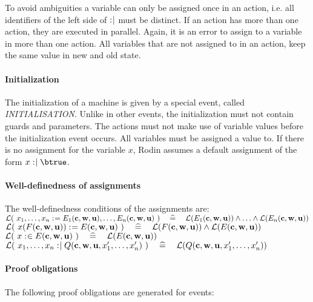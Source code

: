 To avoid ambiguities a variable can only be assigned once in an action, i.e. all identifiers 
  of the left side of $\mathrel{:\mkern1mu\mid}$ must be distinct.
If an action has more than one action, they are executed in parallel. Again, it is an error
  to assign to a variable in more than one action.
All variables that are not assigned to in an action, keep the same value in new and old state.

\paragraph{Initialization}
The initialization of a machine is given by a special event, called \textsl{INITIALISATION}.
Unlike in other events, the initialization must not contain guards and parameters.
The actions must not make use of variable values before the initialization event occurs.
All variables must be assigned a value to. If there is no assignment for the variable $x$,
Rodin assumes a default assignment of the form $x\bcmsuch \btrue$.

\paragraph{Well-definedness of assignments}
\label{welldefinedness_of_assignments}
The well-definedness conditions of the assignments are: \\
$\mathcal{L}(~x_1,\ldots,x_n \mathrel{:\mkern1mu=} E_1(\textbf{c},\textbf{w},\textbf{u}),\ldots,E_n(\textbf{c},\textbf{w},\textbf{u})~)
  \quad\mathrel{\widehat=}\quad 
  \mathcal{L}(E_1(\textbf{c},\textbf{w},\textbf{u})) \land \ldots \land \mathcal{L}(E_n(\textbf{c},\textbf{w},\textbf{u}))$ \\
$\mathcal{L}(~x(F(\textbf{c},\textbf{w},\textbf{u})) \mathrel{:\mkern1mu=} E(\textbf{c},\textbf{w},\textbf{u})~)
  \quad\mathrel{\widehat=}\quad 
  \mathcal{L}(F(\textbf{c},\textbf{w},\textbf{u})) \land \mathcal{L}(E(\textbf{c},\textbf{w},\textbf{u}))$ \\
$\mathcal{L}(~x \mathrel{:\mkern1mu\in} E(\textbf{c},\textbf{w},\textbf{u})~)
  \quad\mathrel{\widehat=}\quad
  \mathcal{L}(E(\textbf{c},\textbf{w},\textbf{u}))$\\
$\mathcal{L}(~x_1,\ldots,x_n \mathrel{:\mkern1mu\mid} Q(\textbf{c},\textbf{w},\textbf{u},x_1',\ldots,x_n')~)
  \quad\mathrel{\widehat=}\quad
  \mathcal{L}(Q(\textbf{c},\textbf{w},\textbf{u},x_1',\ldots,x_n'))$
\paragraph{Proof obligations}
The following proof obligations are generated for events:

